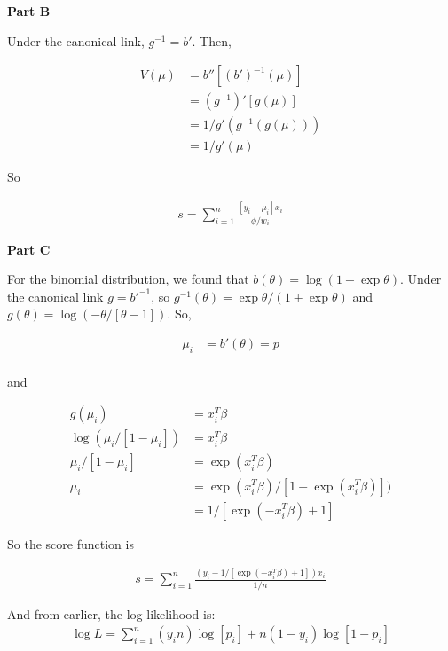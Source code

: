 \documentclass[12pt]{amsart}
\begin{document}
{\bf Part B
} \\
\bigskip
\bigskip

Under the canonical link, $g^{-1}=b'$. Then,

\begin{align*}
    V(\mu) &= b''[(b')^{-1}(\mu)]\\
    &= (g^{-1})'[g(\mu)]\\
     &= 1/g'(g^{-1}(g(\mu)))\\
     &=1/g'(\mu)
\end{align*}

So 

\begin{align*}
    s =  \sum_{i=1}^{n} \frac{[y_i-\mu_i]x_i }{\phi/w_i} 
\end{align*}

\bigskip

{\bf Part C
} \\
\bigskip
\bigskip

For the binomial distribution, we found that $b(\theta)=\log(1+\exp \theta)$. Under the canonical link $g=b'^{-1}$, so $g^{-1}(\theta)= \exp\theta/(1+\exp \theta)$ and $g(\theta)=\log(-\theta/[\theta-1])$. So,


\begin{align*}
    \mu_i &= b'(\theta)=p\\
\end{align*}

and

\begin{align*}
    g(\mu_i) &= x_i^T\beta \\
    \log(\mu_i/[1-\mu_i]) &= x_i^T\beta\\
    \mu_i/[1-\mu_i] &= \exp(x_i^T\beta)\\
    \mu_i &= \exp(x_i^T\beta)/[1+\exp(x_i^T\beta)])\\
    &= 1/[\exp(-x_i^T\beta)+1]
\end{align*}


So the score function is

\begin{align*}
    s =  \sum_{i=1}^{n} \frac{(y_i-1/[\exp(-x_i^T\beta)+1])x_i }{1/n} 
\end{align*}

And from earlier, the log likelihood is:\\


\begin{align*}
    \log L =  \sum_{i=1}^{n}  (y_in)\log[p_i] + n(1-y_i)\log[1-p_i]
\end{align*}
\end{document}
